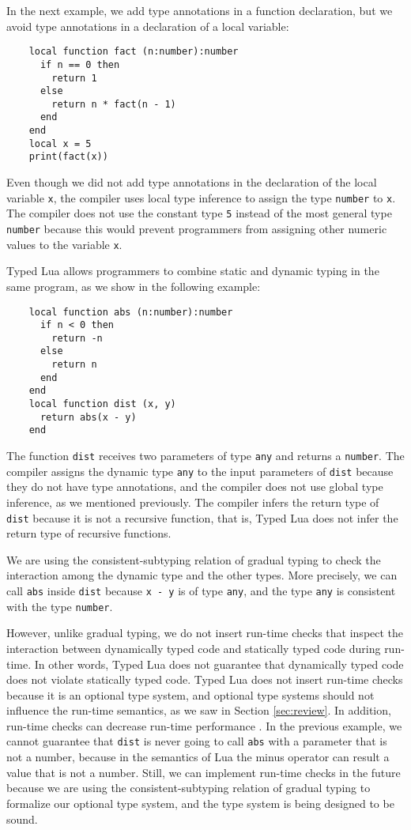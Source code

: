 \documentclass[preprint]{sig-alternate}
\begin{document}
In the next example, we add type annotations in a function
declaration, but we avoid type annotations in a declaration of a local
variable:
\begin{verbatim}
    local function fact (n:number):number
      if n == 0 then
        return 1
      else
        return n * fact(n - 1)
      end
    end
    local x = 5
    print(fact(x))
\end{verbatim}

Even though we did not add type annotations in the declaration of
the local variable \verb'x', the compiler uses local type inference to
assign the type \verb'number' to \verb'x'.
The compiler does not use the constant type \verb'5' instead of the
most general type \verb'number' because this would prevent
programmers from assigning other numeric values to the variable
\verb'x'.

Typed Lua allows programmers to combine static and dynamic
typing in the same program, as we show in the following example:
\begin{verbatim}
    local function abs (n:number):number
      if n < 0 then
        return -n
      else
        return n
      end
    end
    local function dist (x, y)
      return abs(x - y)
    end
\end{verbatim}

The function \verb'dist' receives two parameters of type \verb'any'
and returns a \verb'number'.
The compiler assigns the dynamic type \verb'any' to the input
parameters of \verb'dist' because they do not have type annotations,
and the compiler does not use global type inference, as we mentioned
previously.
The compiler infers the return type of \verb'dist' because it is
not a recursive function, that is, Typed Lua does not infer the return
type of recursive functions.

We are using the consistent-subtyping relation of gradual
typing to check the interaction among the dynamic type and the other
types.
More precisely, we can call \verb'abs' inside \verb'dist' because
\verb'x - y' is of type \verb'any', and the type \verb'any' is
consistent with the type \verb'number'.

However, unlike gradual typing, we do not insert run-time checks that
inspect the interaction between dynamically typed code and statically
typed code during run-time.
In other words, Typed Lua does not guarantee that dynamically typed
code does not violate statically typed code.
Typed Lua does not insert run-time checks because it is an optional
type system, and optional type systems should not influence the
run-time semantics, as we saw in Section \ref{sec:review}.
In addition, run-time checks can decrease run-time performance
\cite{allende2013cis}.
In the previous example, we cannot guarantee that \verb'dist' is never
going to call \verb'abs' with a parameter that is not a number,
because in the semantics of Lua the minus operator can result a value
that is not a number.
Still, we can implement run-time checks in the future because we are
using the consistent-subtyping relation of gradual typing to
formalize our optional type system, and the type system is being
designed to be sound.
\end{document}
